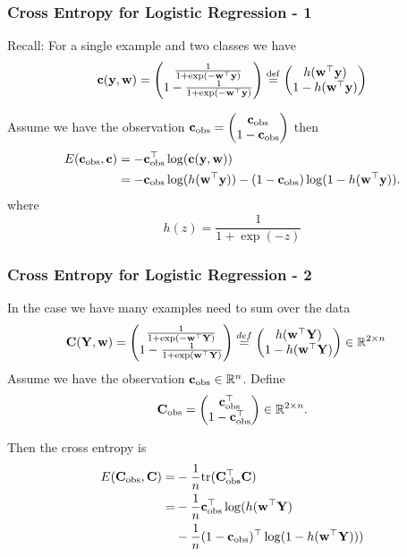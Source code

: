 \documentclass[12pt,fleqn,handout]{beamer}
\begin{document}
\begin{frame}
	\frametitle{Cross Entropy for Logistic Regression - 1}

Recall: For a single example and two classes we have
 $$
  {\bf c}({\bf y},{\bf w})  = \begin{pmatrix}
  	{\frac 1 {1+\exp(-{\bf w}^{\top} {\bf y})}} \\
	1-{\frac 1 {1+\exp(-{\bf w}^{\top} {\bf y})}}
  \end{pmatrix} 
  \stackrel{\rm def}{=} 
  \begin{pmatrix}
  	h({\bf w}^{\top}{\bf y}) \\1-h({\bf w}^{\top}{\bf y})
  \end{pmatrix}
 $$

Assume we have the observation ${\bf c}_{\rm obs} = \begin{pmatrix}
	{\bf c}_{\rm obs} \\ 1-{\bf c}_{\rm obs}
\end{pmatrix}$ then
\begin{align*}
 E({\bf c}_{\rm obs}, {\bf c}) & = -{\bf c}_{\rm obs}^\top\log({\bf c}({\bf y},{\bf w})) \\
 & = -{\bf c}_{\rm obs} \log(h({\bf w}^{\top}{\bf y})) - (1-{\bf c}_{\rm obs})
\log(1-h({\bf w}^{\top}{\bf y})). 
\end{align*}
where
$$
 h(z) = \frac{1}{1+\exp(-z)}
$$
\end{frame}

\begin{frame}
	\frametitle{Cross Entropy for Logistic Regression - 2}


In the case we have many examples need to sum over the data
\begin{align*}
	{\bf C}({\bf Y},{\bf w}) & = \begin{pmatrix}
		{\frac 1 {1+\exp(-{\bf w}^\top {\bf Y})}} \\
		1-{\frac 1 {1+\exp({\bf w}^\top{\bf Y})}}
	\end{pmatrix}  \stackrel{def}{=} \begin{pmatrix}
		h({\bf w}^\top {\bf Y})\\ 1-h({\bf w}^\top{\bf Y})
	\end{pmatrix}
	\in \mathbb{R}^{2\times n}
\end{align*}
Assume we have the observation ${\bf c}_{\rm obs}\in\mathbb{R}^n$. Define
$$
{\bf C}_{\rm obs} = \begin{pmatrix}
	{\bf c}_{\rm obs}^\top \\ 1-{\bf c}_{\rm obs}^\top
\end{pmatrix} \in \mathbb{R}^{2 \times n}.
$$

Then the cross entropy is
\begin{align*}
	E({\bf C}_{\rm obs}, {\bf C})  =& - \frac{1}{n} {\rm tr}({\bf C}_{\rm obs}^\top {\bf C}) \\
	 						 = & -\frac{1}{n} {\bf c}_{\rm obs}^{\top} \log(h({\bf w}^\top{\bf Y}) \\
							   & - \frac{1}{n}(1-{\bf c}_{\rm obs})^{\top}\log(1-h({\bf w}^\top{\bf Y})))
\end{align*}

\end{frame}
\end{document}
